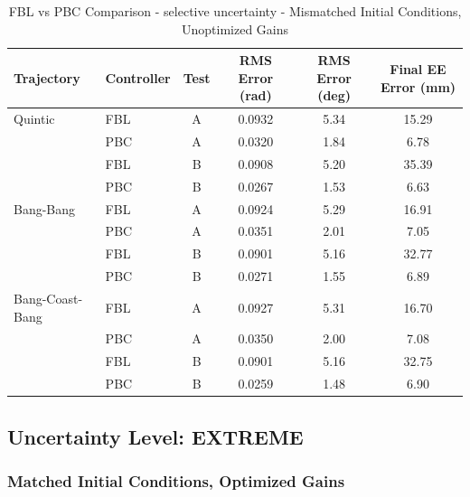 \documentclass[11pt,a4paper]{article}
\begin{document}
\begin{table}[H]
\centering
\caption{FBL vs PBC Comparison - selective uncertainty - Mismatched Initial Conditions, Unoptimized Gains}
\begin{tabular}{llcccc}
\toprule
Trajectory & Controller & Test & RMS Error (rad) & RMS Error (deg) & Final EE Error (mm) \\
\midrule
Quintic & FBL & A & 0.0932 & 5.34 & 15.29 \\
 & PBC & A & \textcolor{bestcolor}{0.0320} & \textcolor{bestcolor}{1.84} & \textcolor{bestcolor}{6.78} \\
 & FBL & B & 0.0908 & 5.20 & 35.39 \\
 & PBC & B & \textcolor{bestcolor}{0.0267} & \textcolor{bestcolor}{1.53} & \textcolor{bestcolor}{6.63} \\
\midrule
Bang-Bang & FBL & A & 0.0924 & 5.29 & 16.91 \\
 & PBC & A & \textcolor{bestcolor}{0.0351} & \textcolor{bestcolor}{2.01} & \textcolor{bestcolor}{7.05} \\
 & FBL & B & 0.0901 & 5.16 & 32.77 \\
 & PBC & B & \textcolor{bestcolor}{0.0271} & \textcolor{bestcolor}{1.55} & \textcolor{bestcolor}{6.89} \\
\midrule
Bang-Coast-Bang & FBL & A & 0.0927 & 5.31 & 16.70 \\
 & PBC & A & \textcolor{bestcolor}{0.0350} & \textcolor{bestcolor}{2.00} & \textcolor{bestcolor}{7.08} \\
 & FBL & B & 0.0901 & 5.16 & 32.75 \\
 & PBC & B & \textcolor{bestcolor}{0.0259} & \textcolor{bestcolor}{1.48} & \textcolor{bestcolor}{6.90} \\
\bottomrule
\end{tabular}
\end{table}

\subsection{Uncertainty Level: EXTREME}

\subsubsection{Matched Initial Conditions, Optimized Gains}
\end{document}
